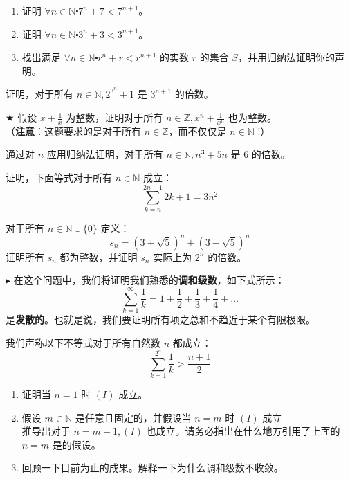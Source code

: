 \begin{exercise}
    \begin{enumerate}[label=(\alph*)]
        \item 证明 $\forall n \in \mathbb{N} \centerdot 7^n+7 < 7^{n+1}$。
        \item 证明 $\forall n \in \mathbb{N} \centerdot 3^n+3 < 3^{n+1}$。
        \item 找出满足 $\forall n \in \mathbb{N} \centerdot r^n+r < r^{n+1}$ 的实数 $r$ 的集合 $S$，并用归纳法证明你的声明。
    \end{enumerate}
\end{exercise}

\begin{exercise}
    证明，对于所有 $n \in \mathbb{N}, 2^{3^n}+1$ 是 $3^{n+1}$ 的倍数。
\end{exercise}

\begin{exercise}
    $\bigstar$ 假设 $x + \frac{1}{x}$ 为整数，证明对于所有 $n \in \mathbb{Z}, x^n + \frac{1}{x^n}$ 也为整数。\\
    （\textbf{注意}：这题要求的是对于所有 $n \in \mathbb{Z}$，而不仅仅是 $n \in \mathbb{N}$ !）
\end{exercise}

\begin{exercise}
    通过对 $n$ 应用归纳法证明，对于所有 $n \in \mathbb{N}, n^3+5n$ 是 $6$ 的倍数。
\end{exercise}

\begin{exercise}
    证明，下面等式对于所有 $n \in \mathbb{N}$ 成立：
    \[\sum_{k=n}^{2n-1} 2k+1=3n^2\]
\end{exercise}

\begin{exercise}
    对于所有 $n \in \mathbb{N} \cup \{0\}$ 定义：
    \[s_n=(3+\sqrt{5})^n+(3-\sqrt{5})^n\]
    证明所有 $s_n$ 都为整数，并证明 $s_n$ 实际上为 $2^n$ 的倍数。
\end{exercise}

\begin{exercise}
    $\blacktriangleright$ 在这个问题中，我们将证明我们熟悉的\textbf{调和级数}，如下式所示：
    \[\sum_{k=1}^{\infty} \frac{1}{k} = 1+\frac{1}{2}+\frac{1}{3}+\frac{1}{4}+\dots\]
    是\textbf{发散的}。也就是说，我们要证明所有项之总和不趋近于某个有限极限。

    我们声称以下不等式对于所有自然数 $n$ 都成立：
    \[\sum_{k=1}^{2^n} \frac{1}{k} > \frac{n+1}{2} \tag{I}\]
    \begin{enumerate}[label=(\alph*)]
        \item 证明当 $n=1$ 时 $(I)$ 成立。
        \item 假设 $m \in \mathbb{N}$ 是任意且固定的，并假设当 $n=m$ 时 $(I)$ 成立 \\
            推导出对于 $n=m+1, (I)$ 也成立。请务必指出在什么地方引用了上面的 $n=m$ 是的假设。
        \item 回顾一下目前为止的成果。解释一下为什么调和级数不收敛。
    \end{enumerate}
\end{exercise}

